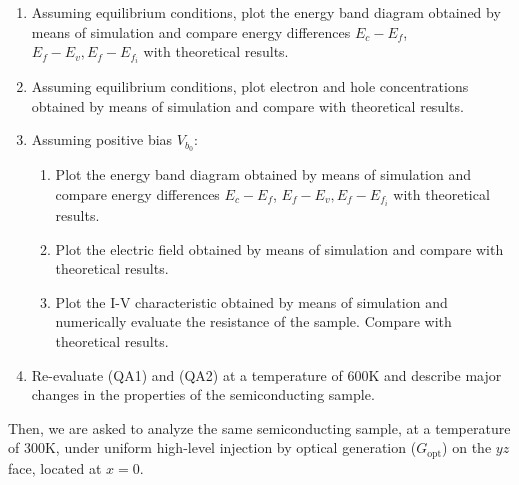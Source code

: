 \documentclass{book}
\begin{document}
            \begin{enumerate}[label=(QA\arabic*), leftmargin=1.5cm]
                \item Assuming equilibrium conditions, plot the energy band diagram obtained by means of simulation and compare energy differences $E_{c} - E_{f}$, $E_{f} - E_{v}, E_{f} - E_{f_i}$ with theoretical results.
                \item Assuming equilibrium conditions, plot electron and hole concentrations obtained by means of simulation and compare with theoretical results.
                \item Assuming positive bias $V_{b_0}$:
                    \begin{enumerate}[label=(QA3.\arabic*)]
                        \item Plot the energy band diagram obtained by means of simulation and compare energy differences $E_{c} - E_{f}$, $E_{f} - E_{v}, E_{f} - E_{f_i}$ with theoretical results. 
                        \item Plot the electric field obtained by means of simulation and compare with theoretical results.
                        \item Plot the I-V characteristic obtained by means of simulation and numerically evaluate the resistance of the sample. Compare with theoretical results.
                    \end{enumerate}
                \item Re-evaluate (QA1) and (QA2) at a temperature of 600K and describe major changes in the properties of the semiconducting sample. 
            \end{enumerate}

            Then, we are asked to analyze the same semiconducting sample, at a temperature of 300K, under uniform high-level injection by optical generation ($G_{\text{opt}}$) on the $yz$ face, located at $x = 0$.
\end{document}
